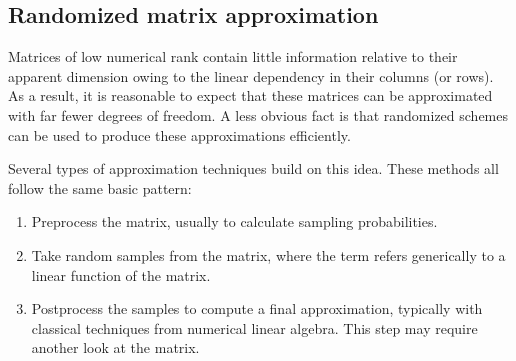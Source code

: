 \documentclass[final]{siamltex}
\newcommand{\pgnotate}[1]{{\color{blue}[#1]}}
\begin{document}
\subsection{Randomized matrix approximation}

Matrices of low numerical rank contain little
information relative to their apparent dimension owing to
the linear dependency in their columns (or rows).
As a result, it
is reasonable to expect that these matrices can be approximated
with far fewer degrees of freedom.
A less obvious fact is that randomized schemes
can be used to produce these approximations efficiently.

Several types of approximation techniques build on this
idea.  These methods all follow the same basic pattern:

\lsp


%
%

\begin{enumerate}
\item   Preprocess the matrix, usually to calculate sampling probabilities.

\item   Take random samples from the matrix, where the term 
refers generically to a linear function of the matrix.

\item   Postprocess the samples to compute a final approximation, typically with classical techniques
from numerical linear algebra.  This step may require another look at the matrix.
\end{enumerate}


\lsp
\end{document}
